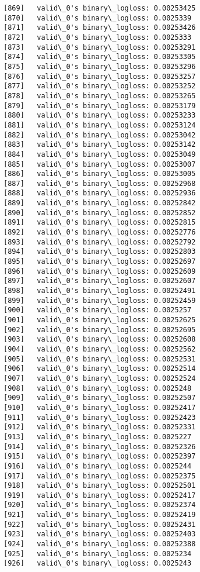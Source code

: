\documentclass[11pt]{article}
\begin{document}
\begin{Verbatim}[commandchars=\\\{\}]
[869]	valid\_0's binary\_logloss: 0.00253425
[870]	valid\_0's binary\_logloss: 0.0025339
[871]	valid\_0's binary\_logloss: 0.00253426
[872]	valid\_0's binary\_logloss: 0.0025333
[873]	valid\_0's binary\_logloss: 0.00253291
[874]	valid\_0's binary\_logloss: 0.00253305
[875]	valid\_0's binary\_logloss: 0.00253296
[876]	valid\_0's binary\_logloss: 0.00253257
[877]	valid\_0's binary\_logloss: 0.00253252
[878]	valid\_0's binary\_logloss: 0.00253265
[879]	valid\_0's binary\_logloss: 0.00253179
[880]	valid\_0's binary\_logloss: 0.00253233
[881]	valid\_0's binary\_logloss: 0.00253124
[882]	valid\_0's binary\_logloss: 0.00253042
[883]	valid\_0's binary\_logloss: 0.00253142
[884]	valid\_0's binary\_logloss: 0.00253049
[885]	valid\_0's binary\_logloss: 0.00253007
[886]	valid\_0's binary\_logloss: 0.00253005
[887]	valid\_0's binary\_logloss: 0.00252968
[888]	valid\_0's binary\_logloss: 0.00252936
[889]	valid\_0's binary\_logloss: 0.00252842
[890]	valid\_0's binary\_logloss: 0.00252852
[891]	valid\_0's binary\_logloss: 0.00252815
[892]	valid\_0's binary\_logloss: 0.00252776
[893]	valid\_0's binary\_logloss: 0.00252792
[894]	valid\_0's binary\_logloss: 0.00252803
[895]	valid\_0's binary\_logloss: 0.00252697
[896]	valid\_0's binary\_logloss: 0.00252609
[897]	valid\_0's binary\_logloss: 0.00252607
[898]	valid\_0's binary\_logloss: 0.00252491
[899]	valid\_0's binary\_logloss: 0.00252459
[900]	valid\_0's binary\_logloss: 0.0025257
[901]	valid\_0's binary\_logloss: 0.00252625
[902]	valid\_0's binary\_logloss: 0.00252695
[903]	valid\_0's binary\_logloss: 0.00252608
[904]	valid\_0's binary\_logloss: 0.00252562
[905]	valid\_0's binary\_logloss: 0.00252531
[906]	valid\_0's binary\_logloss: 0.00252514
[907]	valid\_0's binary\_logloss: 0.00252524
[908]	valid\_0's binary\_logloss: 0.0025248
[909]	valid\_0's binary\_logloss: 0.00252507
[910]	valid\_0's binary\_logloss: 0.00252417
[911]	valid\_0's binary\_logloss: 0.00252423
[912]	valid\_0's binary\_logloss: 0.00252331
[913]	valid\_0's binary\_logloss: 0.0025227
[914]	valid\_0's binary\_logloss: 0.00252326
[915]	valid\_0's binary\_logloss: 0.00252397
[916]	valid\_0's binary\_logloss: 0.0025244
[917]	valid\_0's binary\_logloss: 0.00252375
[918]	valid\_0's binary\_logloss: 0.00252501
[919]	valid\_0's binary\_logloss: 0.00252417
[920]	valid\_0's binary\_logloss: 0.00252374
[921]	valid\_0's binary\_logloss: 0.00252419
[922]	valid\_0's binary\_logloss: 0.00252431
[923]	valid\_0's binary\_logloss: 0.00252403
[924]	valid\_0's binary\_logloss: 0.00252388
[925]	valid\_0's binary\_logloss: 0.0025234
[926]	valid\_0's binary\_logloss: 0.0025243

\end{Verbatim}
\end{document}
